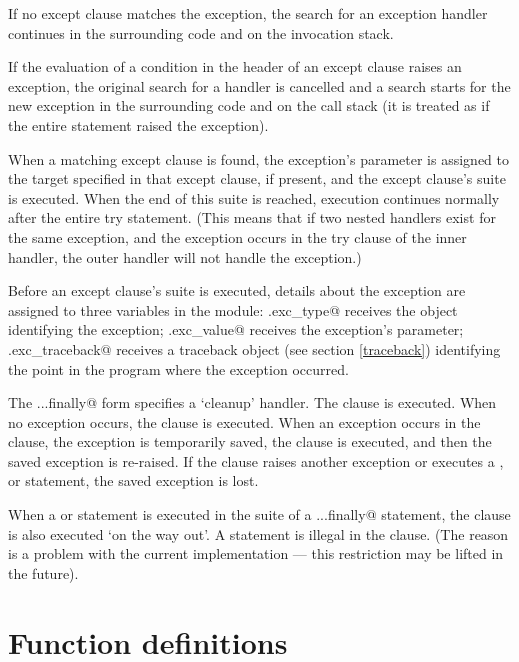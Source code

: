 If no except clause matches the exception, the search for an exception
handler continues in the surrounding code and on the invocation stack.

If the evaluation of a condition in the header of an except clause
raises an exception, the original search for a handler is cancelled
and a search starts for the new exception in the surrounding code and
on the call stack (it is treated as if the entire \verb@try@ statement
raised the exception).

When a matching except clause is found, the exception's parameter is
assigned to the target specified in that except clause, if present,
and the except clause's suite is executed.  When the end of this suite
is reached, execution continues normally after the entire try
statement.  (This means that if two nested handlers exist for the same
exception, and the exception occurs in the try clause of the inner
handler, the outer handler will not handle the exception.)

Before an except clause's suite is executed, details about the
exception are assigned to three variables in the \verb@sys@ module:
\verb@sys.exc_type@ receives the object identifying the exception;
\verb@sys.exc_value@ receives the exception's parameter;
\verb@sys.exc_traceback@ receives a traceback object (see section
\ref{traceback}) identifying the point in the program where the
exception occurred.

The \verb@try...finally@ form specifies a `cleanup' handler.  The
\verb@try@ clause is executed.  When no exception occurs, the
\verb@finally@ clause is executed.  When an exception occurs in the
\verb@try@ clause, the exception is temporarily saved, the
\verb@finally@ clause is executed, and then the saved exception is
re-raised.  If the \verb@finally@ clause raises another exception or
executes a \verb@return@, \verb@break@ or \verb@continue@ statement,
the saved exception is lost.

When a \verb@return@ or \verb@break@ statement is executed in the
\verb@try@ suite of a \verb@try...finally@ statement, the
\verb@finally@ clause is also executed `on the way out'.  A
\verb@continue@ statement is illegal in the \verb@try@ clause.  (The
reason is a problem with the current implementation --- this
restriction may be lifted in the future).

\section{Function definitions} \label{function}

